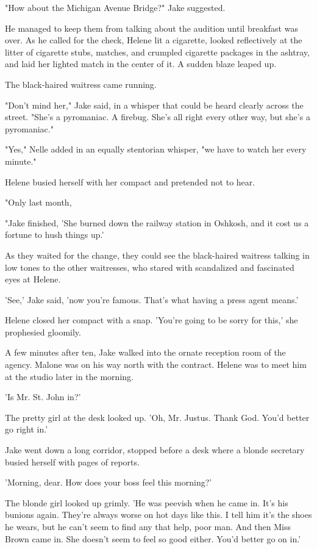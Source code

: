\documentclass{novel}
\begin{document}
"How about the Michigan Avenue Bridge?" Jake suggested.

He managed to keep them from talking about the audition until breakfast was over. As he called for the check, Helene lit a cigarette, looked reflectively at the litter of cigarette stubs, matches, and crumpled cigarette packages in the ashtray, and laid her lighted match in the center of it. A sudden blaze leaped up.

The black-haired waitress came running.

"Don't mind her," Jake said, in a whisper that could be heard clearly across the street. "She's a pyromaniac. A firebug. She's all right every other way, but she's a pyromaniac."

"Yes," Nelle added in an equally stentorian whisper, "we have to watch her every minute."

Helene busied herself with her compact and pretended not to hear.

"Only last month,

"Jake finished, 'She burned down the railway station in Oshkosh, and it cost us a fortune to hush things up.'

As they waited for the change, they could see the black-haired waitress talking in low tones to the other waitresses, who stared with scandalized and fascinated eyes at Helene.

'See,' Jake said, 'now you’re famous. That’s what having a press agent means.'

Helene closed her compact with a snap. 'You’re going to be sorry for this,' she prophesied gloomily.

A few minutes after ten, Jake walked into the ornate reception room of the agency. Malone was on his way north with the contract. Helene was to meet him at the studio later in the morning.

'Is Mr. St. John in?'

The pretty girl at the desk looked up. 'Oh, Mr. Justus. Thank God. You’d better go right in.'

Jake went down a long corridor, stopped before a desk where a blonde secretary busied herself with pages of reports.

'Morning, dear. How does your boss feel this morning?'

The blonde girl looked up grimly. 'He was peevish when he came in. It’s his bunions again. They’re always worse on hot days like this. I tell him it’s the shoes he wears, but he can’t seem to find any that help, poor man. And then Miss Brown came in. She doesn’t seem to feel so good either. You’d better go on in.'
\end{document}

